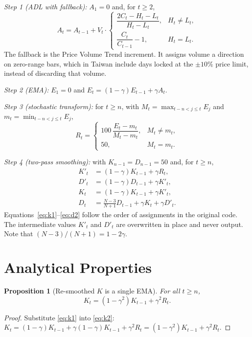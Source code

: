 \documentclass[conference]{IEEEtran}
\newtheorem{proposition}{Proposition}
\begin{document}
\emph{Step 1 (ADL with fallback):} $A_1=0$ and, for $t\ge2$,
\begin{equation}
A_t = A_{t-1} + V_t\cdot
\begin{cases}
\dfrac{2C_t-H_t-L_t}{H_t-L_t}, & H_t\neq L_t,\\[2mm]
\dfrac{C_t}{C_{t-1}}-1, & H_t = L_t.
\end{cases}
\label{eq:adl}
\end{equation}
The fallback is the Price Volume Trend increment. It assigns volume a direction on zero-range bars, which in Taiwan include days locked at the $\pm10\%$ price limit, instead of discarding that volume.

\emph{Step 2 (EMA):} $E_1 = 0$ and $E_t = (1-\gamma)E_{t-1} + \gamma A_t$.

\emph{Step 3 (stochastic transform):} for $t \ge n$, with $M_t=\max_{t-n<j\le t}E_j$ and $m_t=\min_{t-n<j\le t}E_j$,
\begin{equation}
R_t = \begin{cases} 100\,\dfrac{E_t-m_t}{M_t-m_t}, & M_t\neq m_t,\\ 50, & M_t = m_t.\end{cases}
\end{equation}

\emph{Step 4 (two-pass smoothing):} with $K_{n-1}=D_{n-1}=50$ and, for $t\ge n$,
\begin{align}
K'_t &= (1-\gamma)K_{t-1} + \gamma R_t, \label{eq:k1}\\
D'_t &= (1-\gamma)D_{t-1} + \gamma K'_t, \label{eq:d1}\\
K_t  &= (1-\gamma)K_{t-1} + \gamma K'_t, \label{eq:k2}\\
D_t  &= \tfrac{N-3}{N+1}D_{t-1} + \gamma K_t + \gamma D'_t. \label{eq:d2}
\end{align}
Equations~\eqref{eq:k1}--\eqref{eq:d2} follow the order of assignments in the original code. The intermediate values $K'_t$ and $D'_t$ are overwritten in place and never output. Note that $(N-3)/(N+1) = 1-2\gamma$.

\section{Analytical Properties}\label{sec:theory}
\begin{proposition}[Re-smoothed $K$ is a single EMA]\label{prop:k}
For all $t\ge n$,
\begin{equation}
K_t = (1-\gamma^2)K_{t-1} + \gamma^2 R_t .
\end{equation}
\end{proposition}
\begin{proof}
Substitute \eqref{eq:k1} into \eqref{eq:k2}: $K_t = (1-\gamma)K_{t-1} + \gamma(1-\gamma)K_{t-1} + \gamma^2 R_t = (1-\gamma^2)K_{t-1}+\gamma^2R_t$.
\end{proof}
\end{document}
